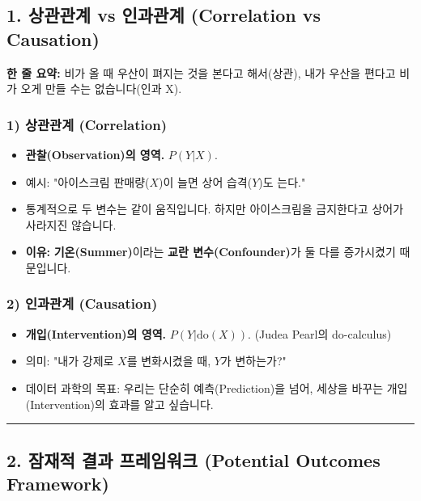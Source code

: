 \documentclass[11pt,a4paper]{book}
\theoremstyle{definition}
\begin{document}
\subsection{1. 상관관계 vs 인과관계 (Correlation vs Causation)}

\begin{conceptbox}[title={개념 1: 보기만 하는 것 vs 행동하는 것}]
\textbf{한 줄 요약:} 비가 올 때 우산이 펴지는 것을 본다고 해서(상관), 내가 우산을 편다고 비가 오게 만들 수는 없습니다(인과 X).
\end{conceptbox}

\subsubsection*{1) 상관관계 (Correlation)}
\begin{itemize}
    \item \textbf{관찰(Observation)의 영역.} $P(Y | X)$.
    \item 예시: "아이스크림 판매량($X$)이 늘면 상어 습격($Y$)도 는다."
    \item 통계적으로 두 변수는 같이 움직입니다. 하지만 아이스크림을 금지한다고 상어가 사라지진 않습니다.
    \item \textbf{이유:} \textbf{기온(Summer)}이라는 \textbf{교란 변수(Confounder)}가 둘 다를 증가시켰기 때문입니다.
\end{itemize}

\subsubsection*{2) 인과관계 (Causation)}
\begin{itemize}
    \item \textbf{개입(Intervention)의 영역.} $P(Y | \text{do}(X))$. (Judea Pearl의 do-calculus)
    \item 의미: "내가 강제로 $X$를 변화시켰을 때, $Y$가 변하는가?"
    \item 데이터 과학의 목표: 우리는 단순히 예측(Prediction)을 넘어, 세상을 바꾸는 개입(Intervention)의 효과를 알고 싶습니다.
\end{itemize}

\vspace{0.5cm}\hrule\vspace{0.5cm}

\subsection{2. 잠재적 결과 프레임워크 (Potential Outcomes Framework)}
\end{document}
